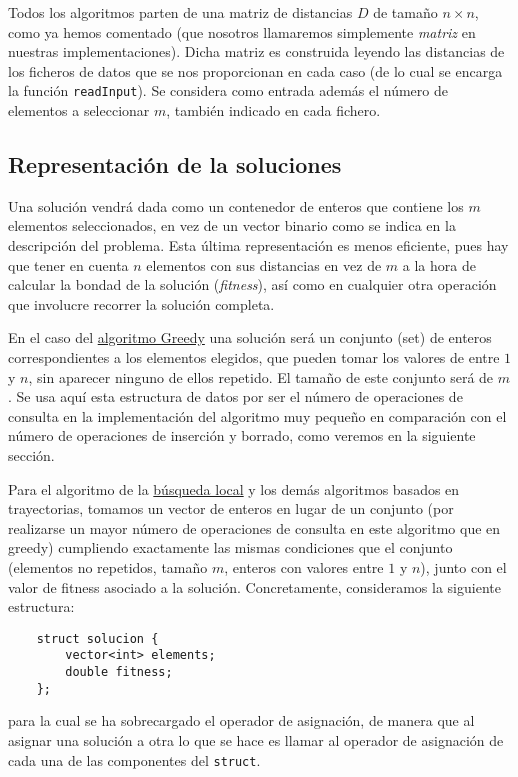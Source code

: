\documentclass[11pt,a4paper]{article}
\begin{document}
	Todos los algoritmos parten de una matriz de distancias $D$ de tamaño $n\times n$, como ya hemos comentado (que nosotros llamaremos simplemente \textit{matriz} en nuestras implementaciones). Dicha matriz es construida leyendo las distancias de los ficheros de datos que se nos proporcionan en cada caso (de lo cual se encarga la función \lstinline|readInput|). Se considera como entrada además el número de elementos a seleccionar $m$, también indicado en cada fichero. 
	
	\subsection{Representación de la soluciones}
	
	Una solución vendrá dada como un contenedor de enteros que contiene los $m$ elementos seleccionados, en vez de un vector binario como se indica en la descripción del problema. Esta última representación es menos eficiente, pues hay que tener en cuenta $n$ elementos con sus distancias en vez de $m$ a la hora de calcular la bondad de la solución (\textit{fitness}), así como en cualquier otra operación que involucre recorrer la solución completa.
	
	En el caso del \underline{algoritmo Greedy} una solución será un conjunto (set) de enteros correspondientes a los elementos elegidos, que pueden tomar los valores de entre $1$ y $n$, sin aparecer ninguno de ellos repetido. El tamaño de este conjunto será de $m$. Se usa aquí esta estructura de datos por ser el número de operaciones de consulta en la implementación del algoritmo muy pequeño en comparación con el número de operaciones de inserción y borrado, como veremos en la siguiente sección. 
	
	 Para el algoritmo de la \underline{búsqueda local} y los demás algoritmos basados en trayectorias, tomamos un vector de enteros en lugar de un conjunto (por realizarse un mayor número de operaciones de consulta en este algoritmo que en greedy) cumpliendo exactamente las mismas condiciones que el conjunto (elementos no repetidos, tamaño $m$, enteros con valores entre $1$ y $n$),  junto con el valor de fitness asociado a la solución. Concretamente, consideramos la siguiente estructura:

	\begin{lstlisting}
	struct solucion {
		vector<int> elements;
		double fitness;
	};
	\end{lstlisting}
	
	para la cual se ha sobrecargado el operador de asignación, de manera que al asignar una solución a otra lo que se hace es llamar al operador de asignación de cada una de las componentes del \lstinline|struct|.
	
\end{document}
